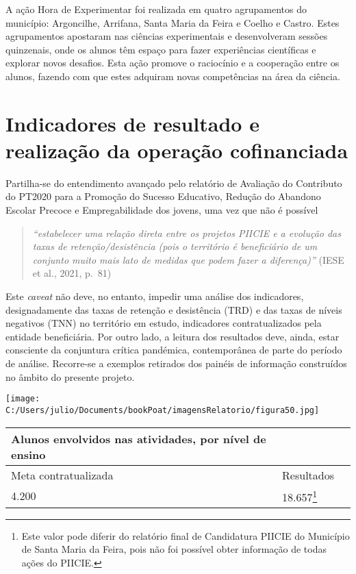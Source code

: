 \documentclass[
]{book}
\begin{document}
A ação Hora de Experimentar foi realizada em quatro agrupamentos do município: Argoncilhe, Arrifana, Santa Maria da Feira e Coelho e Castro. Estes agrupamentos apostaram nas ciências experimentais e desenvolveram sessões quinzenais, onde os alunos têm espaço para fazer experiências científicas e explorar novos desafios. Esta ação promove o raciocínio e a cooperação entre os alunos, fazendo com que estes adquiram novas competências na área da ciência.

\hypertarget{indicadores-de-resultado-e-realizauxe7uxe3o-da-operauxe7uxe3o-cofinanciada}{%
\section{\texorpdfstring{\textbf{Indicadores de resultado e realização da operação cofinanciada}}{Indicadores de resultado e realização da operação cofinanciada}}\label{indicadores-de-resultado-e-realizauxe7uxe3o-da-operauxe7uxe3o-cofinanciada}}

Partilha-se do entendimento avançado pelo relatório de Avaliação do Contributo do PT2020 para a Promoção do Sucesso Educativo, Redução do Abandono Escolar Precoce e Empregabilidade dos jovens, uma vez que não é possível

\begin{quote}
\emph{``estabelecer uma relação direta entre os projetos PIICIE e a evolução das taxas de retenção/desistência (pois o território é beneficiário de um conjunto muito mais lato de medidas que podem fazer a diferença)''} (IESE et al., 2021, p.~81)
\end{quote}

Este \emph{caveat} não deve, no entanto, impedir uma análise dos indicadores, designadamente das taxas de retenção e desistência (TRD) e das taxas de níveis negativos (TNN) no território em estudo, indicadores contratualizados pela entidade beneficiária. Por outro lado, a leitura dos resultados deve, ainda, estar consciente da conjuntura crítica pandémica, contemporânea de parte do período de análise. Recorre-se a exemplos retirados dos painéis de informação construídos no âmbito do presente projeto.

\texttt{[image: C:/Users/julio/Documents/bookPoat/imagensRelatorio/figura50.jpg]}

\begin{longtable}[]{@{}lll@{}}
\toprule()
Alunos envolvidos nas atividades, por nível de ensino & & \\
\midrule()
\endhead
Meta contratualizada & Resultados & \\
4.200 & 18.657\footnote{Este valor pode diferir do relatório final de Candidatura PIICIE do Município de Santa Maria da Feira, pois não foi possível obter informação de todas ações do PIICIE.} & \\
\bottomrule()
\end{longtable}
\end{document}
